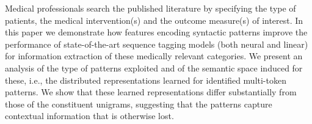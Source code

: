 Medical professionals search the published literature by specifying the type of patients, the medical intervention(s) and the outcome measure(s) of interest. In this paper we demonstrate how features encoding syntactic patterns improve the performance of state-of-the-art sequence tagging models (both neural and linear) for information extraction of these medically relevant categories. We present an analysis of the type of patterns exploited and of the semantic space induced for these, i.e., the distributed representations learned for identified multi-token patterns. We show that these learned representations differ substantially from those of the constituent unigrams, suggesting that the patterns capture contextual information that is otherwise lost.
